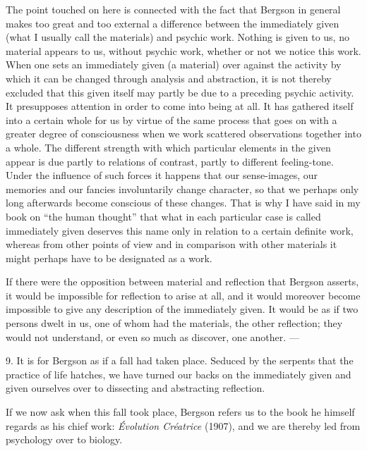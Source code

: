 \documentclass[12pt,a4paper,openany]{book}
\newcommand{\opage}[1]{\marginnote{\footnotesize\textit{[#1]}}}
\begin{document}
The point touched on here is connected with the fact that Bergson in general makes too great and too external a difference between the immediately given (what I usually call the materials) and psychic work. Nothing is given to us, no material appears to us, without psychic work, whether or not we notice this work. When one sets an immediately given (a material) over against the activity by which it can be changed through analysis and abstraction, it is not thereby excluded that this given itself may partly be due to a preceding psychic activity. It presupposes attention in order to come into being at all. It has gathered itself into a certain whole for us by virtue of the same process that goes on with a greater degree of consciousness when we work scattered observations together into a whole. The different strength with which particular elements in the given
\opage{17}appear is due partly to relations of contrast, partly to different feeling-tone. Under the influence of such forces it happens that our sense-images, our memories and our fancies involuntarily change character, so that we perhaps only long afterwards become conscious of these changes. That is why I have said in my book on ``the human thought'' that what in each particular case is called immediately given deserves this name only in relation to a certain definite work, whereas from other points of view and in comparison with other materials it might perhaps have to be designated as a work.

If there were the opposition between material and reflection that Bergson asserts, it would be impossible for reflection to arise at all, and it would moreover become impossible to give any description of the immediately given. It would be as if two persons dwelt in us, one of whom had the materials, the other reflection; they would not understand, or even so much as discover, one another. ---

9. It is for Bergson as if a fall had taken place. Seduced by the serpents that the practice of life hatches, we have turned our backs on the immediately given and given ourselves over to dissecting and abstracting reflection.

If we now ask when this fall took place, Bergson refers us to the book he himself regards as his chief work: \textit{Évolution Créatrice} (1907), and we are thereby led from psychology over to biology.
\end{document}
